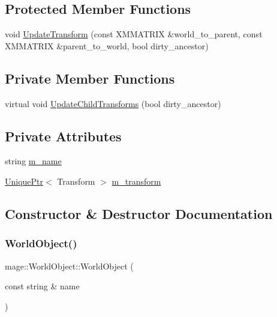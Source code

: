 \subsection*{Protected Member Functions}
\begin{DoxyCompactItemize}
\item 
void \hyperlink{classmage_1_1_world_object_a1c4736646ad66488fe2e0706a784924d}{Update\+Transform} (const X\+M\+M\+A\+T\+R\+IX \&world\+\_\+to\+\_\+parent, const X\+M\+M\+A\+T\+R\+IX \&parent\+\_\+to\+\_\+world, bool dirty\+\_\+ancestor)
\end{DoxyCompactItemize}
\subsection*{Private Member Functions}
\begin{DoxyCompactItemize}
\item 
virtual void \hyperlink{classmage_1_1_world_object_ab384751f7c14c931e8606f927825b6c8}{Update\+Child\+Transforms} (bool dirty\+\_\+ancestor)
\end{DoxyCompactItemize}
\subsection*{Private Attributes}
\begin{DoxyCompactItemize}
\item 
string \hyperlink{classmage_1_1_world_object_a383cc5e1275f389459021a16b958049c}{m\+\_\+name}
\item 
\hyperlink{namespacemage_a8c307fbcc33bce9b7f2aa4c26c3b95cf}{Unique\+Ptr}$<$ Transform $>$ \hyperlink{classmage_1_1_world_object_aa9b856a22731a70f9200e79d0f9a45ee}{m\+\_\+transform}
\end{DoxyCompactItemize}


\subsection{Constructor \& Destructor Documentation}
\hypertarget{classmage_1_1_world_object_a40d714ae9da1e197171c55f8fd321cc4}{}\label{classmage_1_1_world_object_a40d714ae9da1e197171c55f8fd321cc4} 
\subsubsection{\texorpdfstring{World\+Object()}{WorldObject()}\hspace{0.1cm}{\footnotesize\ttfamily [1/3]}}
{\footnotesize\ttfamily mage\+::\+World\+Object\+::\+World\+Object (\begin{DoxyParamCaption}\item[{const string \&}]{name }\end{DoxyParamCaption})\hspace{0.3cm}{\ttfamily [explicit]}}

